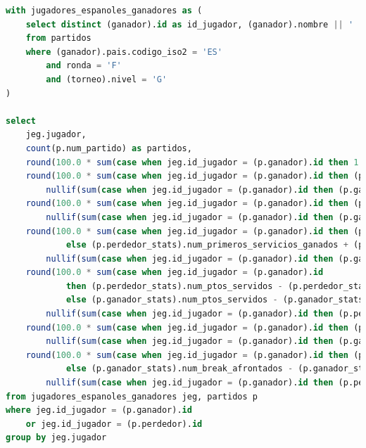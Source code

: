 \documentclass[10pt]{opticajnl}
\begin{document}
\begin{lstlisting}[language=SQL]
with jugadores_espanoles_ganadores as (
    select distinct (ganador).id as id_jugador, (ganador).nombre || ' ' || (ganador).apellido AS jugador
    from partidos
    where (ganador).pais.codigo_iso2 = 'ES'
        and ronda = 'F'
        and (torneo).nivel = 'G'
)

select
    jeg.jugador,
    count(p.num_partido) as partidos,
    round(100.0 * sum(case when jeg.id_jugador = (p.ganador).id then 1 else 0 end) / count(p.num_partido), 1) as pcje_victorias,
    round(100.0 * sum(case when jeg.id_jugador = (p.ganador).id then (p.ganador_stats).num_aces else (p.perdedor_stats).num_aces end) /
        nullif(sum(case when jeg.id_jugador = (p.ganador).id then (p.ganador_stats).num_ptos_servidos else (p.perdedor_stats).num_ptos_servidos end), 0), 1) as pcje_aces,
    round(100.0 * sum(case when jeg.id_jugador = (p.ganador).id then (p.ganador_stats).num_dob_faltas else (p.perdedor_stats).num_dob_faltas end) /
        nullif(sum(case when jeg.id_jugador = (p.ganador).id then (p.ganador_stats).num_ptos_servidos else (p.perdedor_stats).num_ptos_servidos end), 0), 1) as pcje_dobles_faltas,
    round(100.0 * sum(case when jeg.id_jugador = (p.ganador).id then (p.ganador_stats).num_primeros_servicios_ganados + (p.ganador_stats).num_segundos_servicios_ganados
            else (p.perdedor_stats).num_primeros_servicios_ganados + (p.perdedor_stats).num_segundos_servicios_ganados end) /
        nullif(sum(case when jeg.id_jugador = (p.ganador).id then (p.ganador_stats).num_ptos_servidos else (p.perdedor_stats).num_ptos_servidos end), 0), 1) as pcje_servicios_ganados,
    round(100.0 * sum(case when jeg.id_jugador = (p.ganador).id
            then (p.perdedor_stats).num_ptos_servidos - (p.perdedor_stats).num_primeros_servicios_ganados - (p.perdedor_stats).num_segundos_servicios_ganados
            else (p.ganador_stats).num_ptos_servidos - (p.ganador_stats).num_primeros_servicios_ganados - (p.ganador_stats).num_segundos_servicios_ganados end) /
        nullif(sum(case when jeg.id_jugador = (p.ganador).id then (p.perdedor_stats).num_ptos_servidos else (p.ganador_stats).num_ptos_servidos end), 0), 1) as pcje_restos_ganados,
    round(100.0 * sum(case when jeg.id_jugador = (p.ganador).id then (p.ganador_stats).num_break_salvados else (p.perdedor_stats).num_break_salvados end) /
        nullif(sum(case when jeg.id_jugador = (p.ganador).id then (p.ganador_stats).num_break_afrontados else (p.perdedor_stats).num_break_afrontados end), 0), 1) as pcje_breaks_salvados,
    round(100.0 * sum(case when jeg.id_jugador = (p.ganador).id then (p.perdedor_stats).num_break_afrontados - (p.perdedor_stats).num_break_salvados
            else (p.ganador_stats).num_break_afrontados - (p.ganador_stats).num_break_salvados end) /
        nullif(sum(case when jeg.id_jugador = (p.ganador).id then (p.perdedor_stats).num_break_afrontados else (p.ganador_stats).num_break_afrontados end), 0), 1) as pcje_breaks_ganados
from jugadores_espanoles_ganadores jeg, partidos p
where jeg.id_jugador = (p.ganador).id
    or jeg.id_jugador = (p.perdedor).id
group by jeg.jugador
\end{lstlisting}
\end{document}

